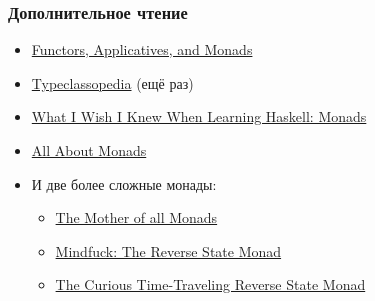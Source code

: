 \documentclass[11pt]{beamer}
\begin{document}
\begin{frame}[fragile]
  \frametitle{Дополнительное чтение}
  \begin{itemize}
    \item \href{https://www.snoyman.com/blog/2017/01/functors-applicatives-and-monads}{Functors, Applicatives, and Monads}
    \item \href{https://wiki.haskell.org/Typeclassopedia}{Typeclassopedia} (ещё раз)
    \item \href{http://dev.stephendiehl.com/hask/#monads}{What I Wish I Knew When Learning Haskell: Monads}
    \item \href{https://wiki.haskell.org/All_About_Monads}{All About Monads}
    \item И две более сложные монады:
          \begin{itemize}
            \item \href{http://blog.sigfpe.com/2008/12/mother-of-all-monads.html}{The Mother of all Monads}
            \item \href{https://lukepalmer.wordpress.com/2008/08/10/mindfuck-the-reverse-state-monad/}{Mindfuck: The Reverse State Monad}
            \item \href{https://tech-blog.capital-match.com/posts/5-the-reverse-state-monad.html}{The Curious Time-Traveling Reverse State Monad}
          \end{itemize}
  \end{itemize}
\end{frame}
\end{document}
